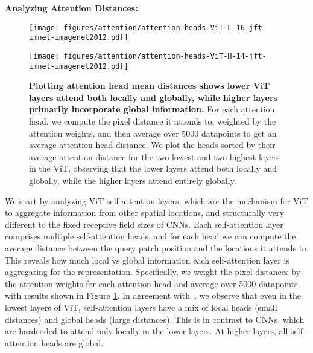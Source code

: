 \documentclass{article}
\begin{document}
\textbf{Analyzing Attention Distances:}
\begin{figure}
\centering
    \begin{gridlayout}{\linewidth}{5.5cm}
        \begin{row}{1}
            \begin{cell}{0.5}
                \centering
                \texttt{[image: figures/attention/attention-heads-ViT-L-16-jft-imnet-imagenet2012.pdf]}
            \end{cell}
            \begin{cell}{0.5}
                \centering
                \texttt{[image: figures/attention/attention-heads-ViT-H-14-jft-imnet-imagenet2012.pdf]}
            \end{cell}
        \end{row}
    \end{gridlayout}
    \caption{\small \textbf{Plotting attention head mean distances shows lower ViT layers attend both locally and globally, while higher layers primarily incorporate global information.} For each attention head, we compute the pixel distance it attends to, weighted by the attention weights, and then average over 5000 datapoints to get an average attention head distance. We plot the heads sorted by their average attention distance for the two lowest and two highest layers in the ViT, observing that the lower layers attend both locally and globally, while the higher layers attend entirely globally. }
    \label{fig:attention-heads-plot}
\end{figure}
We start by analyzing ViT self-attention layers, which are the mechanism for ViT to aggregate information from other spatial locations, and structurally very different to the fixed receptive field sizes of CNNs. Each self-attention layer comprises multiple self-attention heads, and for each head we can compute the average distance between the query patch position and the locations it attends to.
This reveals how much local vs global information each self-attention layer is aggregating for the representation.
Specifically, we weight the pixel distances by the attention weights for each attention head and average over 5000 datapoints, with results shown in Figure \ref{fig:attention-heads-plot}. 
In agreement with~\citet{dosovitskiy2020image}, we observe that even in the lowest layers of ViT, self-attention layers have a mix of local heads (small distances) and global heads (large distances).
This is in contrast to CNNs, which are hardcoded to attend only locally in the lower layers.
At higher layers, all self-attention heads are global.
\end{document}
